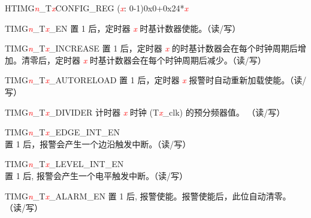 \begin{register}{H}{TIMG\textcolor{red}{\it{n}}\_T\textcolor{red}{\it{x}}CONFIG\_REG (\textcolor{red}{\it{x}}: 0-1)}{0x0+0x24*\textcolor{red}{\it{x}}}\label{regdesc:TIMERSTnCONFIGREG}
%
%
%
%
%
%
%
%
\regnewline%
\begin{regdesc}\begin{reglist}
\item [TIMG\textcolor{red}{\it{n}}\_T\textcolor{red}{\it{x}}\_EN]置 1 后，定时器 \textcolor{red}{\it{x}} 时基计数器使能。（读/写）
\item [TIMG\textcolor{red}{\it{n}}\_T\textcolor{red}{\it{x}}\_INCREASE]置 1 后，定时器 \textcolor{red}{\it{x}} 的时基计数器会在每个时钟周期后增加。清零后，定时器 \textcolor{red}{\it{x}} 时基计数器会在每个时钟周期后减少。（读/写）
\item [TIMG\textcolor{red}{\it{n}}\_T\textcolor{red}{\it{x}}\_AUTORELOAD]置 1 后，定时器 \textcolor{red}{\it{x}} 报警时自动重新加载使能。（读/写）
\item [TIMG\textcolor{red}{\it{n}}\_T\textcolor{red}{\it{x}}\_DIVIDER]计时器 \textcolor{red}{\it{x}} 时钟 (T\textcolor{red}{\it{x}}\_clk) 的预分频器值。 （读/写）
\item [TIMG\textcolor{red}{\it{n}}\_T\textcolor{red}{\it{x}}\_EDGE\_INT\_EN]置 1 后，报警会产生一个边沿触发中断。（读/写）
\item [TIMG\textcolor{red}{\it{n}}\_T\textcolor{red}{\it{x}}\_LEVEL\_INT\_EN]置 1 后, 报警会产生一个电平触发中断。（读/写）
\item [TIMG\textcolor{red}{\it{n}}\_T\textcolor{red}{\it{x}}\_ALARM\_EN]\label{TIMGnTxALARMEN}置 1 后, 报警使能。报警使能后，此位自动清零。 （读/写）
\end{reglist}\end{regdesc}
\end{register}


